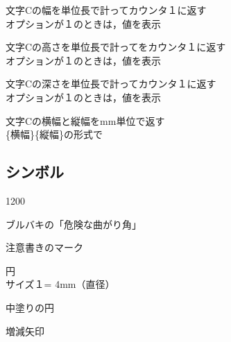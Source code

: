 \documentclass[a4j]{jarticle}
\begin{document}


文字Cの幅を単位長で計ってカウンタ１に返す\\
\chuu オプションが１のときは，値を表示

文字Cの高さを単位長で計ってをカウンタ１に返す\\
\chuu オプションが１のときは，値を表示

文字Cの深さを単位長で計ってカウンタ１に返す\\
\chuu オプションが１のときは，値を表示

文字Cの横幅と縦幅をmm単位で返す\\
\chuu \{横幅\}\{縦幅\}の形式で

\subsection{シンボル}

\begin{layer}[120]{120}{0}
\end{layer}

ブルバキの「危険な曲がり角」

注意書きのマーク

 円\\
\chuu サイズ１= 4mm（直径）

中塗りの円

 増減矢印
\end{document}
